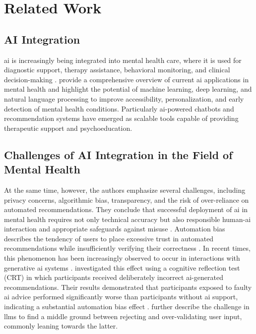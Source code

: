 \documentclass[sigconf,natbib=false]{acmart}
\begin{document}
\section{Related Work}
\label{sec:related-work}

\subsection{AI Integration}
\Gls{ai} is increasingly being integrated into mental health care, where it is used for diagnostic support, therapy assistance, behavioral monitoring, and clinical decision-making \autocite[]{ali_artificial_2025}.
\citeauthor[]{ali_artificial_2025} provide a comprehensive overview of current \Gls{ai} applications in mental health and highlight the potential of machine learning, deep learning, and natural language processing to improve accessibility, personalization, and early detection of mental health conditions.
Particularly \Gls{ai}-powered chatbots and recommendation systems have emerged as scalable tools capable of providing therapeutic support and psychoeducation. 

\subsection{Challenges of AI Integration in the Field of Mental Health}
At the same time, however, the authors emphasize several challenges, including privacy concerns, algorithmic bias, transparency, and the risk of over-reliance on automated recommendations.
They conclude that successful deployment of \Gls{ai} in mental health requires not only technical accuracy but also responsible human-\Gls{ai} interaction and appropriate safeguards against misuse \autocite[]{ali_artificial_2025,jung_ive_2025}. 
Automation bias describes the tendency of users to place excessive trust in automated recommendations while insufficiently verifying their correctness \autocite[p~391]{parasuraman_complacency_2010}. In recent times, this phenomenon has been increasingly observed to occur in interactions with generative \Gls{ai} systems \autocite[]{kucking_automation_2026}. 
\citeauthor[]{wingerter_mitigating_2025} investigated this effect using a cognitive reflection test (CRT) in which participants received deliberately incorrect \Gls{ai}-generated recommendations. 
Their results demonstrated that participants exposed to faulty \Gls{ai} advice performed significantly worse than participants without \Gls{ai} support, indicating a substantial automation bias effect \autocite[]{wingerter_mitigating_2025}. 
\citeauthor*{jung_ive_2025} further describe the challenge in \glspl{llm} to find a middle ground between rejecting and over-validating user input, commonly leaning towards the latter. 
\end{document}
